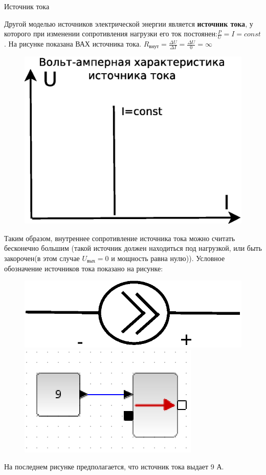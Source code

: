 \documentclass[12pt, pdf, hyperref={unicode},handout]{beamer}
\begin{document}
\begin{frame}{ Источник тока}
  \begin{block}

    \small{
      Другой моделью источников электрической энергии является \textbf{источник тока}, у которого при изменении сопротивления нагрузки его ток постоянен:$\frac{P}{U}=I=const$. На рисунке показана ВАХ источника тока. $R_{\text{внут}}=\frac{\Delta U}{\Delta I}=\frac{\Delta U}{0}=\infty$
  \begin{figure}[htb] 
    \centering
    \includegraphics [scale=0.6]{ris6.eps}
  \end{figure}
  Таким образом, внутреннее сопротивление источника тока можно считать бесконечно большим (такой источник должен находиться под нагрузкой, или быть закорочен(в этом случае $U_{\text{вых}}=0$ и мощность равна нулю)).
  Условное обозначение источников тока показано на рисунке:
\begin{figure}[htb] 
    \centering
    \includegraphics [scale=0.6]{ris7.eps}
    \includegraphics [scale=0.8]{ris8.eps}
  \end{figure}
  На последнем рисунке предполагается, что источник тока выдает 9 А.
}

  \end{block}
  
\end{frame}
\end{document}
